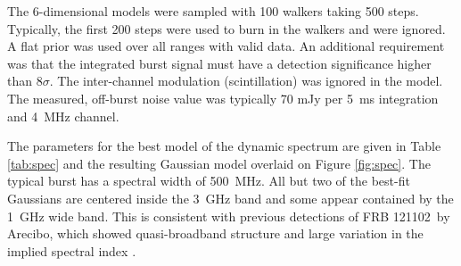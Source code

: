 \documentclass[twocolumn]{aastex61}
\newcommand{\frb}{FRB 121102}
\begin{document}
The 6-dimensional models were sampled with 100 walkers taking 500 steps. Typically, the first 200 steps were used to burn in the walkers and were ignored. A flat prior was used over all ranges with valid data. An additional requirement was that the integrated burst signal must have a detection significance higher than 8$\sigma$. The inter-channel modulation (scintillation) was ignored in the model. The measured, off-burst noise value was typically 70 mJy per 5~ms integration and 4~MHz channel.

The parameters for the best model of the dynamic spectrum are given in Table \ref{tab:spec} and the resulting Gaussian model overlaid on Figure \ref{fig:spec}. The typical burst has a spectral width of 500~MHz. All but two of the best-fit Gaussians are centered inside the 3~GHz band and some appear contained by the 1~GHz wide band. This is consistent with previous detections of \frb\ by Arecibo, which showed quasi-broadband structure \citep{2016arXiv160308880S} and large variation in the implied spectral index \citep{2014ApJ...790..101S}. 
\end{document}
